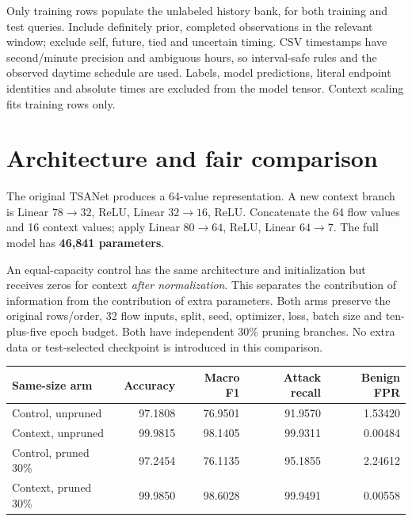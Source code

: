 \documentclass[11pt,a4paper,oneside]{report}
\begin{document}
Only training rows populate the unlabeled history bank, for both training and test queries. Include definitely prior, completed observations in the relevant window; exclude self, future, tied and uncertain timing. CSV timestamps have second/minute precision and ambiguous hours, so interval-safe rules and the observed daytime schedule are used. Labels, model predictions, literal endpoint identities and absolute times are excluded from the model tensor. Context scaling fits training rows only.

\section{Architecture and fair comparison}
The original TSANet produces a 64-value representation. A new context branch is Linear $78\to32$, ReLU, Linear $32\to16$, ReLU. Concatenate the 64 flow values and 16 context values; apply Linear $80\to64$, ReLU, Linear $64\to7$. The full model has \textbf{46,841 parameters}.

An equal-capacity control has the same architecture and initialization but receives zeros for context \emph{after normalization}. This separates the contribution of information from the contribution of extra parameters. Both arms preserve the original rows/order, 32 flow inputs, split, seed, optimizer, loss, batch size and ten-plus-five epoch budget. Both have independent 30\% pruning branches. No extra data or test-selected checkpoint is introduced in this comparison.


{\small
\begin{longtable}{@{}lrrrr@{}}
\toprule
Same-size arm & Accuracy & Macro F1 & Attack recall & Benign FPR\\\midrule\endhead
Control, unpruned & 97.1808 & 76.9501 & 91.9570 & 1.53420\\
Context, unpruned & 99.9815 & 98.1405 & 99.9311 & 0.00484\\
Control, pruned 30\% & 97.2454 & 76.1135 & 95.1855 & 2.24612\\
Context, pruned 30\% & 99.9850 & 98.6028 & 99.9491 & 0.00558\\
\bottomrule\end{longtable}
}
\end{document}
